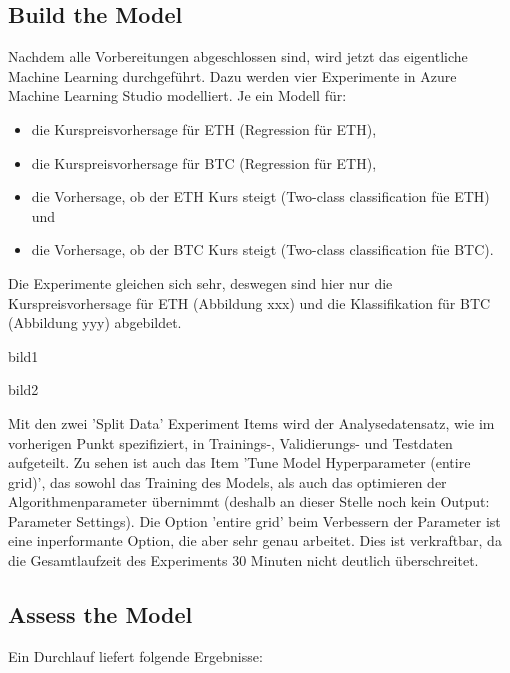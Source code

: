 \subsection{Build the Model}
Nachdem alle Vorbereitungen abgeschlossen sind, wird jetzt das eigentliche Machine Learning durchgeführt. Dazu werden vier Experimente in Azure Machine Learning Studio modelliert. Je ein Modell für:
\begin{itemize}
\item die Kurspreisvorhersage für ETH (Regression für ETH),
\item die Kurspreisvorhersage für BTC (Regression für ETH),
\item die Vorhersage, ob der ETH Kurs steigt (Two-class classification füe ETH) und
\item die Vorhersage, ob der BTC Kurs steigt (Two-class classification füe BTC).
\end{itemize}
Die Experimente gleichen sich sehr, deswegen sind hier nur die Kurspreisvorhersage für ETH (Abbildung xxx) und die Klassifikation für BTC (Abbildung yyy) abgebildet.

bild1

bild2

Mit den zwei 'Split Data' Experiment Items wird der Analysedatensatz, wie im vorherigen Punkt spezifiziert, in Trainings-, Validierungs- und Testdaten aufgeteilt. Zu sehen ist auch das Item 'Tune Model Hyperparameter (entire grid)', das sowohl das Training des Models, als auch das optimieren der Algorithmenparameter übernimmt (deshalb an dieser Stelle noch kein Output: Parameter Settings). Die Option 'entire grid' beim Verbessern der Parameter ist eine inperformante Option, die aber sehr genau arbeitet. Dies ist verkraftbar, da die Gesamtlaufzeit des Experiments 30 Minuten nicht deutlich überschreitet.

\subsection{Assess the Model}
Ein Durchlauf liefert folgende Ergebnisse:

